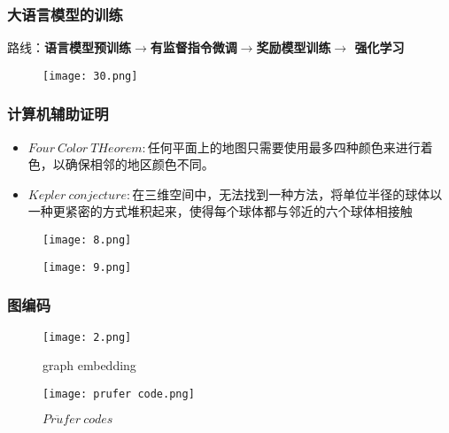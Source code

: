 \documentclass[CJK,aspectratio=169]{beamer}  %
\begin{document}
	\begin{frame}
		\frametitle{大语言模型的训练}
		路线：\textbf{语言模型预训练$\rightarrow$有监督指令微调$\rightarrow$奖励模型训练$\rightarrow$ 强化学习}
		\begin{figure}
			\centering
			\texttt{[image: 30.png]}
			
		\end{figure}
	\end{frame}
	\begin{frame}
		\frametitle{计算机辅助证明}
		\begin{itemize}
			\item \textbf{$Four\ Color\ THeorem:$}任何平面上的地图只需要使用最多四种颜色来进行着色，以确保相邻的地区颜色不同。
			\item \textbf{$Kepler\ conjecture:$}在三维空间中，无法找到一种方法，将单位半径的球体以一种更紧密的方式堆积起来，使得每个球体都与邻近的六个球体相接触
		\end{itemize}
		\begin{figure}
			\begin{minipage}[t]{0.48\textwidth}
				\centering
				\texttt{[image: 8.png]}
			\end{minipage}
			\begin{minipage}[t]{0.48\textwidth}
				\centering
				\texttt{[image: 9.png]}
			\end{minipage}
		\end{figure}
	\end{frame}
	\begin{frame}   %
		\frametitle{图编码}
		\begin{figure}
			\begin{minipage}[t]{0.24\textwidth}
				\centering
				\vspace{-4cm} 
				\texttt{[image: 2.png]}
				\caption{graph embedding}
			\end{minipage}
			\begin{minipage}[t]{0.48\textwidth}
				\centering
				\texttt{[image: prufer code.png]}
				\caption{$Pr\ddot{u}fer\ codes$}
			\end{minipage}
		\end{figure}
		
		
	\end{frame}
	
\end{document}
